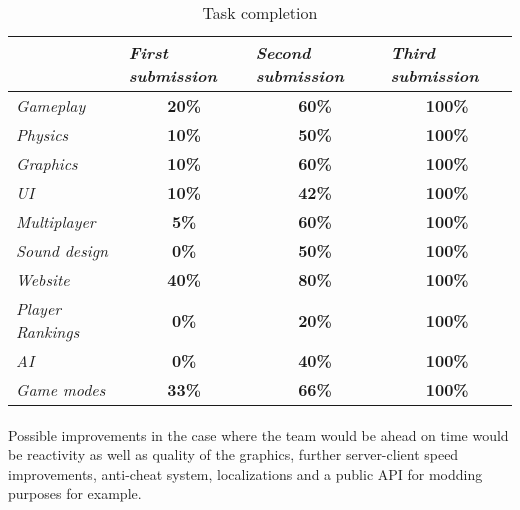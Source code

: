 \newpage
\begin{landscape}

\begin{table}[]
\centering
\caption{Task completion}
\label{my-label}
\begin{tabular}{|lccc|}
\hline
\multicolumn{1}{|c}{\textbf{}} &
\multicolumn{1}{l}{\textit{\textbf{First submission}}} &
\multicolumn{1}{l}{\textit{\textbf{Second submission}}} &
\multicolumn{1}{l|}{\textit{\textbf{Third submission}}} \\ \hline
\multicolumn{1}{|l|}{\textit{Gameplay}}         & \textbf{20\%}     & \textbf{60\%}     & \textbf{100\%}    \\\hline
\multicolumn{1}{|l|}{\textit{Physics}}          & \textbf{10\%}     & \textbf{50\%}     & \textbf{100\%}    \\ \hline
\multicolumn{1}{|l|}{\textit{Graphics}}         & \textbf{10\%}     & \textbf{60\%}     & \textbf{100\%}    \\ \hline
\multicolumn{1}{|l|}{\textit{UI}}               & \textbf{10\%}     & \textbf{42\%}     & \textbf{100\%}    \\ \hline
\multicolumn{1}{|l|}{\textit{Multiplayer}}      & \textbf{5\%}      & \textbf{60\%}     & \textbf{100\%}    \\ \hline
\multicolumn{1}{|l|}{\textit{Sound design}}     & \textbf{0\%}      & \textbf{50\%}     & \textbf{100\%}    \\ \hline
\multicolumn{1}{|l|}{\textit{Website}}          & \textbf{40\%}     & \textbf{80\%}     & \textbf{100\%}    \\ \hline
\multicolumn{1}{|l|}{\textit{Player Rankings}}  & \textbf{0\%}      & \textbf{20\%}     & \textbf{100\%}    \\ \hline
\multicolumn{1}{|l|}{\textit{AI}}               & \textbf{0\%}      & \textbf{40\%}     & \textbf{100\%}    \\ \hline
\multicolumn{1}{|l|}{\textit{Game modes}}       & \textbf{33\%}     & \textbf{66\%}     & \textbf{100\%}    \\ \hline
\end{tabular}
\end{table}

\end{landscape}

\paragraph{}Possible improvements in the case where the team would be ahead on time would be reactivity as well as quality of the graphics, further server-client speed improvements, anti-cheat system, localizations and a public API for modding purposes for example.

